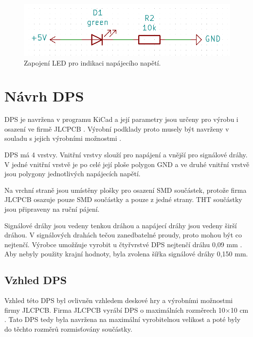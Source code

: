   \begin{figure}[!h]
    \begin{center}
      \includegraphics[scale=0.5]{obrazky/powerLED.png}
    \end{center}
    \caption[Zapojení LED pro indikaci napájecího napětí]{Zapojení LED pro indikaci napájecího napětí.}
  \end{figure}


  \chapter{Návrh DPS}
  DPS je navržena v programu KiCad a její parametry jsou určeny pro výrobu i osazení ve firmě JLCPCB \cite{KiCad} \cite{JLCPCB}. Výrobní 
  podklady proto musely být navrženy v souladu s jejich výrobními možnostmi \cite{JLCPCB_Capabilities}.

  DPS má 4 vrstvy. Vnitřní vrstvy slouží pro napájení a vnější pro signálové dráhy. V jedné vnitřní vrstvě je po celé její ploše 
  polygon GND a ve druhé vnitřní vrstvě jsou polygony jednotlivých napájecích napětí.

  Na vrchní straně jsou umístěny plošky pro osazení SMD součástek, protože firma JLCPCB osazuje pouze SMD součástky a pouze z jedné 
  strany. THT součástky jsou připraveny na ruční pájení.

  Signálové dráhy jsou vedeny tenkou dráhou a napájecí dráhy jsou vedeny širší dráhou. V signálových drahách tečou zanedbatelné 
  proudy, proto mohou být co nejtenčí. Výrobce umožňuje vyrobit u čtyřvrstvé DPS nejtenčí dráhu  0,09 mm \cite{JLCPCB_Capabilities}. 
  Aby nebyly použity krajní hodnoty, byla zvolena šířka signálové dráhy 0,150 mm.


  \section{Vzhled DPS}
  Vzhled této DPS byl ovlivněn vzhledem deskové hry a výrobními možnostmi firmy JLCPCB. Firma JLCPCB vyrábí DPS o maximálních 
  rozměrech 10$\times$10 cm \cite{JLCPCB}. Tato DPS tedy byla navržena na maximální vyrobitelnou velikost a poté byly do těchto 
  rozměrů rozmisťovány součástky.

